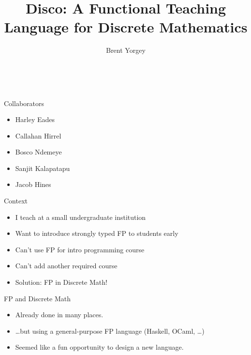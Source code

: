 \documentclass[xcolor=svgnames,12pt]{beamer}
\title{Disco: A Functional Teaching Language for Discrete Mathematics}
\date{\theschool \\ \thedate}
\author{Brent Yorgey}
\newenvironment{xframe}[1][]
  {\begin{frame}[fragile,environment=xframe,#1]}
  {\end{frame}}
\begin{document}
\begin{xframe}{}
   \titlepage
\end{xframe}

\begin{xframe}{Collaborators}
  \begin{itemize}
  \item Harley Eades
  \item Callahan Hirrel
  \item Bosco Ndemeye
  \item Sanjit Kalapatapu
  \item Jacob Hines
  \end{itemize}
\end{xframe}

\begin{xframe}{Context}
  \begin{itemize}
  \item<+-> I teach at a small undergraduate institution
  \item<+-> Want to introduce strongly typed FP to students early
  \item<+-> Can't use FP for intro programming course
  \item<+-> Can't add another required course
  \item<+-> Solution: FP in Discrete Math!
  \end{itemize}
\end{xframe}

\begin{xframe}{FP and Discrete Math}
  \begin{itemize}
  \item<+-> Already done in many places.
  \item<+-> \dots but using a general-purpose FP language (Haskell,
    OCaml, \dots)
  \item<+-> Seemed like a fun opportunity to design a new language.
  \end{itemize}
\end{xframe}

\end{document}
